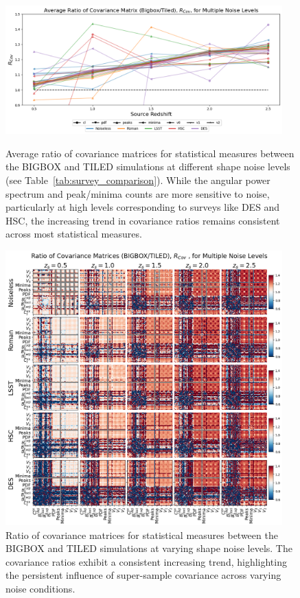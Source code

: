 \begin{figure}[p]
    \centering
    \includegraphics[width=0.95\textwidth]{figures/results/avg_cov_ratio_noise.png}
    \caption[Average BIGBOX/TILED Ratio of Covariance for Multiple Noise Levels]
    {Average ratio of covariance matrices for statistical measures between the BIGBOX and TILED simulations at different shape noise levels (see Table~\ref{tab:survey_comparison}). While the angular power spectrum and peak/minima counts are more sensitive to noise, particularly at high levels corresponding to surveys like DES and HSC, the increasing trend in covariance ratios remains consistent across most statistical measures.}
    \label{fig:avg_cov_noise}
    \includegraphics[width=0.95\textwidth]{figures/results/cov_noise.png}
    \caption[BIGBOX/TILED Ratio of Covariance for Multiple Noise Levels]
    {Ratio of covariance matrices for statistical measures between the BIGBOX and TILED simulations at varying shape noise levels. The covariance ratios exhibit a consistent increasing trend, highlighting the persistent influence of super-sample covariance across varying noise conditions.}
    \label{fig:cov_noise}
\end{figure}

